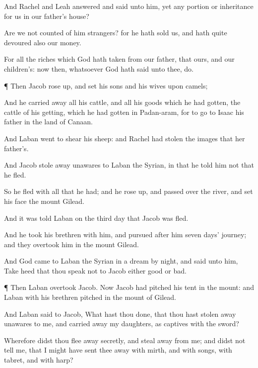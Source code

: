 {And
Rachel and
Leah
answered and
said unto him,
{} yet any
portion or
inheritance for us in our
father’s
house?

Are we not
counted of him
strangers? for he hath
sold us, and hath
quite
devoured also our
money.

For all the
riches which
God hath
taken from our
father, that
{} ours, and our
children’s: now then, whatsoever
God hath
said unto thee,
do.


\par }{\PP {}¶ Then
Jacob rose
up, and
set his
sons and his
wives upon
camels;

And he carried
away all his
cattle, and all his
goods which he had
gotten, the
cattle of his
getting, which he had
gotten in
Padan-aram, for to
go to
Isaac his
father in the
land of
Canaan.

And
Laban
went to
shear his
sheep: and
Rachel had
stolen the
images that
{} her
father’s.

And
Jacob stole
away
unawares to
Laban the
Syrian, in
that he
told him
not that he
fled.

So he
fled with all that he had; and he rose
up, and passed
over the
river, and
set his
face
{} the
mount
Gilead.

And it was
told
Laban on the
third
day that
Jacob was
fled.

And he
took his
brethren with him, and
pursued after
him
seven
days’
journey; and they
overtook him in the
mount
Gilead.

And
God
came to
Laban the
Syrian in a
dream by
night, and
said unto him, Take
heed that thou
speak not
to
Jacob either
good
or
bad.


\par }{\PP {}¶ Then
Laban
overtook
Jacob. Now
Jacob had
pitched his
tent in the
mount: and
Laban with his
brethren
pitched in the
mount of
Gilead.

And
Laban
said to
Jacob, What hast thou
done, that thou hast stolen
away
unawares to me, and carried
away my
daughters, as
captives
{} with the
sword?

Wherefore didst thou flee
away
secretly, and steal
away from me; and didst not
tell me, that I might have sent thee
away with
mirth, and with
songs, with
tabret, and with
harp?

}
